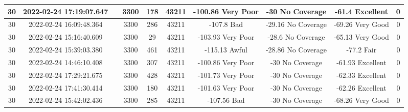 \begin{longtable*}{|c|c|c|c|c|c|c|c|c|c|}
30&2022-02-24 17:19:07.647&&3300&178&43211& -100.86   Very Poor   & -30       No Coverage & -61.4     Excellent   & 0\\\hline
{}30&2022-02-24 16:09:48.364&&3300&286&43211& -107.8    Bad         & -29.16    No Coverage & -69.26    Very Good   & 0\\\hline
{}30&2022-02-24 15:16:40.609&&3300&29&43211& -103.93   Very Poor   & -28.6     No Coverage & -65.13    Very Good   & 0\\\hline
{}30&2022-02-24 15:39:03.380&&3300&461&43211& -115.13   Awful       & -28.86    No Coverage & -77.2     Fair        & 0\\\hline
{}30&2022-02-24 14:46:10.408&&3300&307&43211& -100.86   Very Poor   & -30       No Coverage & -61.93    Excellent   & 0\\\hline
{}30&2022-02-24 17:29:21.675&&3300&428&43211& -101.73   Very Poor   & -30       No Coverage & -62.33    Excellent   & 0\\\hline
{}30&2022-02-24 17:41:30.414&&3300&180&43211& -101.63   Very Poor   & -30       No Coverage & -62.26    Excellent   & 0\\\hline
{}30&2022-02-24 15:42:02.436&&3300&285&43211& -107.56   Bad         & -30       No Coverage & -68.26    Very Good   & 0\\\hline

\end{longtable*}
